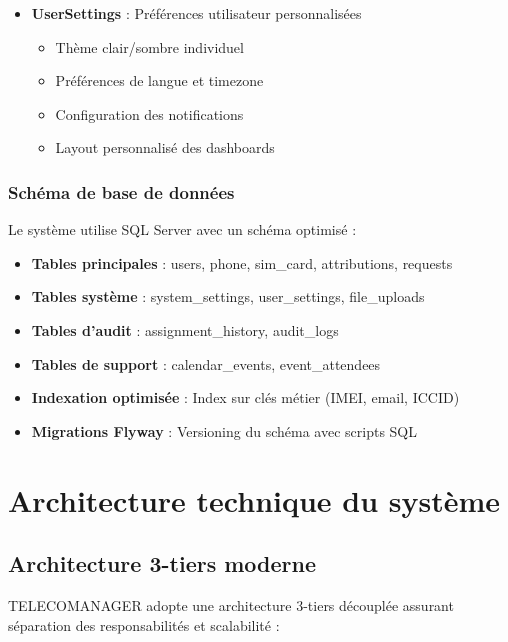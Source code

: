 \documentclass[12pt,a4paper]{report}
\begin{document}
\begin{itemize}
  \begin{itemize}
  \item Paramètres globaux de l'application
  \item Configuration des notifications
  \item Paramètres de sécurité et authentification
  \item Gestion des thèmes et personnalisation
  \end{itemize}
\item \textbf{UserSettings} : Préférences utilisateur personnalisées

  \begin{itemize}
  \item Thème clair/sombre individuel
  \item Préférences de langue et timezone
  \item Configuration des notifications
  \item Layout personnalisé des dashboards
  \end{itemize}
\end{itemize}

\subsubsection{Schéma de base de données}
Le système utilise SQL Server avec un schéma optimisé :

\begin{itemize}
\item \textbf{Tables principales} : users, phone, sim\_card, attributions, requests
\item \textbf{Tables système} : system\_settings, user\_settings, file\_uploads
\item \textbf{Tables d'audit} : assignment\_history, audit\_logs
\item \textbf{Tables de support} : calendar\_events, event\_attendees
\item \textbf{Indexation optimisée} : Index sur clés métier (IMEI, email, ICCID)
\item \textbf{Migrations Flyway} : Versioning du schéma avec scripts SQL
\end{itemize}

\section{Architecture technique du système}

\subsection{Architecture 3-tiers moderne}
TELECOMANAGER adopte une architecture 3-tiers découplée assurant séparation des responsabilités et scalabilité :
\end{document}
